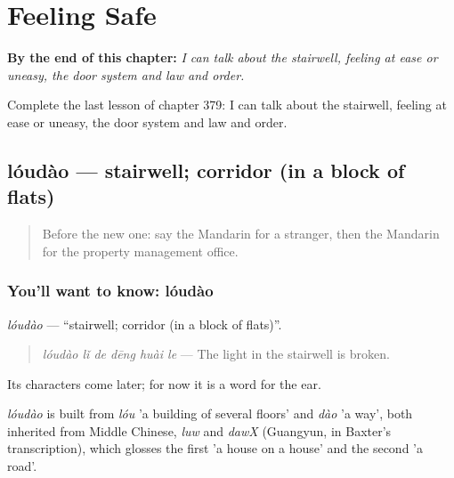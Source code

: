 
\chapter{Feeling Safe}
\label{ch:zh-feeling-safe}

\begin{chapteropening}
\textbf{By the end of this chapter:} \emph{I can talk about the stairwell, feeling at ease or uneasy, the door system and law and order.}

Complete the last lesson of chapter 379: I can talk about the stairwell, feeling at ease or uneasy, the door system and law and order.
\end{chapteropening}

\section[lóudào]{lóudào — stairwell; corridor (in a block of flats)}

\label{lesson:ZH-C379-loudao}



\begin{quote}
Before the new one: say the Mandarin for a stranger, then the Mandarin for the property management office.
\end{quote}

\subsection*{You'll want to know: lóudào}
\emph{lóudào} — \textquotedblleft{}stairwell; corridor (in a block of flats)\textquotedblright{}.

\begin{quote}
\emph{lóudào lǐ de dēng huài le} — The light in the stairwell is broken.
\end{quote}

Its characters come later; for now it is a word for the ear.

\begin{cousinweb}
\emph{lóudào} is built from \emph{lóu} 'a building of several floors' and \emph{dào} 'a way', both inherited from Middle Chinese, \emph{luw} and \emph{dawX} (Guangyun, in Baxter's transcription), which glosses the first 'a house on a house' and the second 'a road'.
\end{cousinweb}

